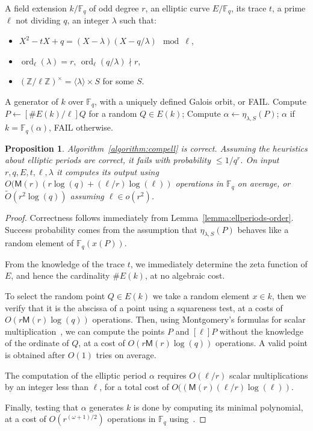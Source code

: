 \documentclass{mcom-l}
\theoremstyle{plain}
\newtheorem{proposition}[theorem]{Proposition}
\theoremstyle{definition}
\newcommand{\tildO}{\tilde{O}}
\DeclareMathOperator{\order}{ord} %
\newcommand{\Z}{\ensuremath{\mathbb{Z}}}
\newcommand{\F}{\ensuremath{\mathbb{F}}}
\newcommand{\MM}{\ensuremath{\mathsf{M}}}
\newcounter{algorithm}
\begin{document}
\begin{algorithm}
\label{algorithm:compell}
  \begin{algorithmic}[1]
    \REQUIRE A field extension $k/\F_q$ of odd degree $r$,
    an elliptic curve $E/\F_q$, its trace $t$, a prime $\ell$ not dividing $q$,
    an integer $\lambda$ such that:
    \begin{itemize}
    \item $X^2 - tX + q = (X-\lambda)(X-q/\lambda) \mod\ell$,
    \item $\order_\ell(\lambda)=r$, $\order_\ell(q/\lambda)\nmid r$,
    \item $(\Z/\ell\Z)^{\times} = \langle{\lambda}\rangle \times S$ for some $S$.
    \end{itemize}
    \ENSURE A generator of $k$ over $\F_q$, with a uniquely defined Galois orbit, or FAIL.
    \REPEAT
    \STATE Compute $P\leftarrow[\# E(k)/\ell]Q$ for a random $Q\in E(k)$;
    \STATE Compute $\alpha\leftarrow\eta_{\lambda,S}(P)$;
    \RETURN $\alpha$ if $k=\F_q(\alpha)$, FAIL otherwise.
  \end{algorithmic}
\end{algorithm}

\begin{proposition}
  Algorithm~\ref{algorithm:compell} is correct. Assuming the
  heuristics about elliptic periods are correct, it fails
  with probability $\le 1/q^r$.  On input
  $r,q,E,t,\ell,\lambda$ it computes its output using
  $O(\MM(r)(r\log(q) + (\ell/r)\log(\ell))$ operations in $\F_q$ on average, or
  $\tildO(r^2\log(q))$ assuming $\ell\in o(r^2)$.
\end{proposition}
\begin{proof}
  Correctness follows immediately from
  Lemma~\ref{lemma:ellperiods-order}. Success probability comes from
  the assumption that $\eta_{\lambda,S}(P)$ behaves like a random element of
  $\F_q(x(P))$.

  From the knowledge of the trace $t$, we immediately determine the
  zeta function of $E$, and hence the cardinality $\# E(k)$, at
  no algebraic cost.

  To select the random point $Q\in E(k)$ we take a random
  element $x\in k$, then we verify that it is the abscissa of a
  point using a squareness test, at a costs of $O(r\MM(r)\log(q))$
  operations. Then, using Montgomery's formulas for scalar
  multiplication~\cite{montgomery}, we can compute the points $P$ and
  $[\ell]P$ without the knowledge of the ordinate of $Q$, at a cost of
  $O(r\MM(r)\log(q))$ operations. A valid point is obtained after
  $O(1)$ tries on average.

  The computation of the elliptic period $\alpha$ requires $O(\ell/r)$ scalar
  multiplications by an integer less than $\ell$, for a total cost of
  $O((\MM(r)(\ell/r)\log(\ell))$.

  Finally, testing that $\alpha$ generates $k$ is done by computing
  its minimal polynomial, at a cost of $O(r^{(\omega+1)/2})$ operations in
  $\F_q$ using~\cite{shoup93}.
\end{proof}
\end{document}
